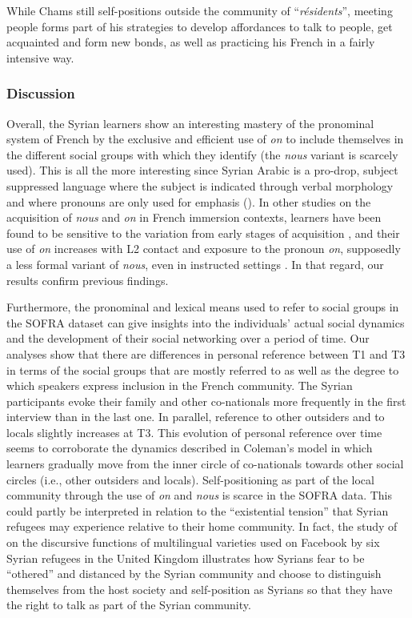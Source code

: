 \documentclass[output=paper]{langscibook}
\begin{document}
While Chams still self-positions outside the community of “\textit{résidents}”, meeting people forms part of his strategies to develop affordances to talk to people, get acquainted and form new bonds, as well as practicing his French in a fairly intensive way.

\subsubsection{Discussion}

Overall, the Syrian learners show an interesting mastery of the pronominal system of French by the exclusive and efficient use of \textit{on} to include themselves in the different social groups with which they identify (the \textit{nous} variant is scarcely used). This is all the more interesting since Syrian Arabic is a pro-drop, subject suppressed language where the subject is indicated through verbal morphology and where pronouns are only used for emphasis (\citealt{Cowell1964, BassiouneyKatz2012}). In other studies on the acquisition of \textit{nous} and \textit{on} in French immersion contexts, learners have been found to be sensitive to the variation from early stages of acquisition \citep{Dewaele2002}, and their use of \textit{on} increases with L2 contact and exposure to the pronoun \textit{on}, supposedly a less formal variant of \textit{nous}, even in instructed settings \citep{RehnerEtAl2003}. In that regard, our results confirm previous findings.

Furthermore, the pronominal and lexical means used to refer to social groups in the SOFRA dataset can give insights into the individuals’ actual social dynamics and the development of their social networking over a period of time. Our analyses show that there are differences in personal reference between T1 and T3 in terms of the social groups that are mostly referred to as well as the degree to which speakers express inclusion in the French community. The Syrian participants evoke their family and other co-nationals more frequently in the first interview than in the last one. In parallel, reference to other outsiders and to locals slightly increases at T3. This evolution of personal reference over time seems to corroborate the dynamics described in Coleman’s model in which learners gradually move from the inner circle of co-nationals towards other social circles (i.e., other outsiders and locals). Self-positioning as part of the local community through the use of \textit{on} and \textit{nous} is scarce in the SOFRA data. This could partly be interpreted in relation to the “existential tension” that Syrian refugees may experience relative to their home community. In fact, the study of \citet[13–14]{McEnteeEtAl2022} on the discursive functions of multilingual varieties used on Facebook by six Syrian refugees in the United Kingdom illustrates how Syrians fear to be “othered” and distanced by the Syrian community and choose to distinguish themselves from the host society and self-position as Syrians so that they have the right to talk as part of the Syrian community.
\end{document}
